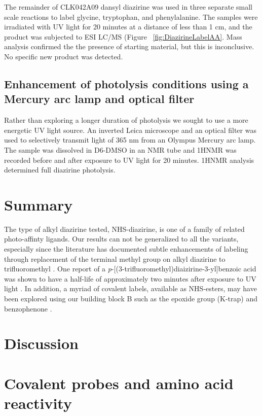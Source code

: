 The remainder of CLK042A09 dansyl diazirine was used in three separate small scale reactions to label glycine, tryptophan, and phenylalanine. The samples were irradiated with UV light for 20 minutes at a distance of less than 1 cm, and the product was subjected to ESI LC/MS (Figure ~\ref{fig:DiazirineLabelAA}. Mass analysis confirmed the the presence of starting material, but this is inconclusive. No specific new product was detected.

\subsection{Enhancement of photolysis conditions using a Mercury arc lamp and optical filter}

Rather than exploring a longer duration of photolysis we sought to use a more energetic UV light source. An inverted Leica microscope and an optical filter was used to selectively transmit light of 365 nm from an Olympus Mercury arc lamp. The sample was dissolved in D6-DMSO in an NMR tube and 1HNMR was recorded before and after exposure to UV light for 20 minutes. 1HNMR analysis determined full diazirine photolysis. 

\section{Summary}

The type of alkyl diazirine tested, NHS-diazirine, is one of a family of related photo-affinty ligands. Our results can not be generalized to all the variants, especially since the literature has documented subtle enhancements of labeling through replacement of the terminal methyl group on alkyl diazirine to trifluoromethyl \cite{huss2002concanamycin,zhang1994location} \cite{blencowe2005development,brunner19803}. One report of a {\it p}-[(3-trifluoromethyl)diaizirine-3-yl]benzoic acid was shown to have a half-life of approximately two minutes after exposure to UV light \cite{hatanaka1994novel}. In addition, a myriad of covalent labels, available as NHS-esters, may have been explored using our building block B such as the epoxide group (K-trap) and benzophenone \cite{krauth2009heterobifunctional}. 

\section{Discussion}

\section{Covalent probes and amino acid reactivity}

